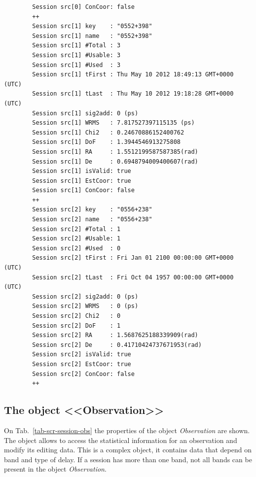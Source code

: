 \documentclass [10pt,letterpaper]{report}
\begin{document}
{{{\begin{verbatim}
        Session src[0] ConCoor: false
        ++
        Session src[1] key    : "0552+398"
        Session src[1] name   : "0552+398"
        Session src[1] #Total : 3
        Session src[1] #Usable: 3
        Session src[1] #Used  : 3
        Session src[1] tFirst : Thu May 10 2012 18:49:13 GMT+0000 (UTC)
        Session src[1] tLast  : Thu May 10 2012 19:18:28 GMT+0000 (UTC)
        Session src[1] sig2add: 0 (ps)
        Session src[1] WRMS   : 7.817527397115135 (ps)
        Session src[1] Chi2   : 0.24670886152400762
        Session src[1] DoF    : 1.3944546913275808
        Session src[1] RA     : 1.5512199587587385(rad)
        Session src[1] De     : 0.6948794009400607(rad)
        Session src[1] isValid: true
        Session src[1] EstCoor: true
        Session src[1] ConCoor: false
        ++
        Session src[2] key    : "0556+238"
        Session src[2] name   : "0556+238"
        Session src[2] #Total : 1
        Session src[2] #Usable: 1
        Session src[2] #Used  : 0
        Session src[2] tFirst : Fri Jan 01 2100 00:00:00 GMT+0000 (UTC)
        Session src[2] tLast  : Fri Oct 04 1957 00:00:00 GMT+0000 (UTC)
        Session src[2] sig2add: 0 (ps)
        Session src[2] WRMS   : 0 (ps)
        Session src[2] Chi2   : 0
        Session src[2] DoF    : 1
        Session src[2] RA     : 1.5687625188339909(rad)
        Session src[2] De     : 0.41710424737671953(rad)
        Session src[2] isValid: true
        Session src[2] EstCoor: true
        Session src[2] ConCoor: false
        ++
\end{verbatim}}




\subsection{The object <<Observation>>}
\label{section-scripting-session-observation}

On Tab.~\ref{tab-scr-session-obs} the properties of the object {\sl Observation}
are shown. The object allows to access the statistical information for an observation
and modify its editing data. This is a complex object, it contains data that depend on
band and type of delay. If a session has more than one band, not all bands can be
present in the object {\sl Observation}.

}}
\end{document}
